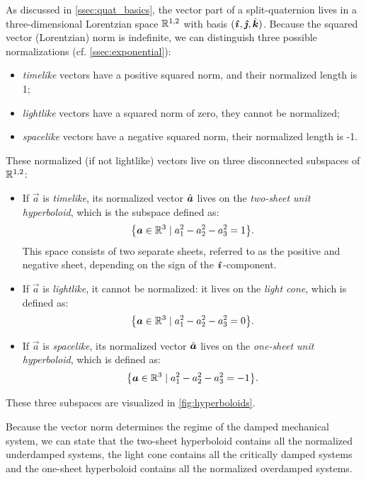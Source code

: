 As discussed in \cref{ssec:quat_basics}, the vector part of a split-quaternion lives in a three-dimensional Lorentzian space $\real^{1, 2}$ with basis \((\quati, \quatj, \quatk)\). Because the squared vector (Lorentzian) norm is indefinite, we can distinguish three possible normalizations (cf. \cref{ssec:exponential}):
\begin{itemize}
    \item \emph{timelike} vectors have a positive squared norm, and their normalized length is 1;
    \item \emph{lightlike} vectors have a squared norm of zero, they cannot be normalized;
    \item \emph{spacelike} vectors have a negative squared norm, their normalized length is -1.
\end{itemize}
These normalized (if not lightlike) vectors live on three disconnected subspaces of $\real^{1, 2}$:
\begin{itemize}
    \item If \(\vec{a}\) is \emph{timelike}, its normalized vector $\uvec{a}$ lives on the \emph{two-sheet unit hyperboloid}, which is the subspace defined as:
        \begin{equation}
            \qty{\vec{a} \in \real^3 \mid a_1^2 - a_2^2 - a_3^2 = 1}.
        \end{equation}
        This space consists of two separate sheets, referred to as the positive and negative sheet, depending on the sign of the \(\quati\)-component.
    \item If \(\vec{a}\) is \emph{lightlike}, it cannot be normalized: it lives on the \emph{light cone}, which is defined as:
        \begin{equation}
            \qty{\vec{a} \in \real^3 \mid a_1^2 - a_2^2 - a_3^2 = 0}.
        \end{equation}
    \item If \(\vec{a}\) is \emph{spacelike}, its normalized vector $\uvec{a}$ lives on the \emph{one-sheet unit hyperboloid}, which is defined as:
        \begin{equation}
            \qty{\vec{a} \in \real^3 \mid a_1^2 - a_2^2 - a_3^2 = -1}.
        \end{equation}
\end{itemize}
These three subspaces are visualized in \cref{fig:hyperboloids}. 

Because the vector norm determines the regime of the damped mechanical system, we can state that the two-sheet hyperboloid contains all the normalized underdamped systems, the light cone contains all the critically damped systems and the one-sheet hyperboloid contains all the normalized overdamped systems.

